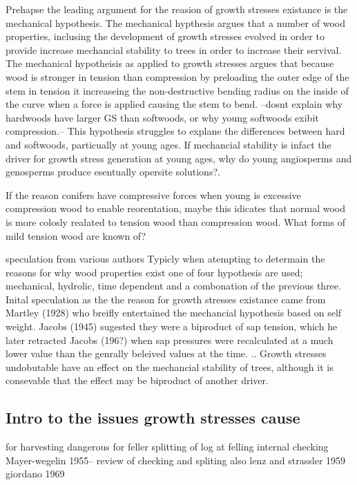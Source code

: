 \documentclass{article}
\begin{document}
Prehapse the leading argument for the reasion of growth stresses existance is
the mechanical hypothesis. The mechanical hypthesis argues that a number of wood properties,
inclusing the development of growth stresses evolved in order to provide
increase mechancial stability to trees in order to increase their servival. The
mechanical hypotheisis as applied to growth stresses argues that because wood is
stronger in tension than compression by preloading the outer edge of the stem
in tension it increaseing the non-destructive bending radius on the inside of
the curve when a force is applied causing the stem to bend. --dosnt explain why
hardwoods have larger GS than softwoods, or why young softwoods exibit
compression.-- This hypothesis struggles to explane the differences between hard
and softwoods, particually at young ages. If mechancial stability is infact the
driver for growth stress generation at young ages, why do young angiosperms and
genosperms produce esentually opersite solutions?.

If the reason conifers have compressive forces when young is excessive
compression wood to enable reorentation, maybe this idicates that normal wood is
more colosly realated to tension wood than compression wood. What forms of mild
tension wood are known of?

speculation from various authors
Typicly when atempting to determain the reasons for why wood properties exist
one of four hypothesis are used; mechanical, hydrolic, time dependent and a
combonation of the previous three. Inital speculation as the the reason for
growth stresses existance came from Martley (1928) who breifly entertained the
mechancial hypothesis based on self weight. Jacobs (1945) sugested they were a
biproduct of sap tension, which he later retracted Jacobs (196?) when sap
pressures were recalculated at a much lower value than the genrally beleived
values at the time. .. Growth stresses undobutable have an effect on the
mechancial stability of trees, although it is consevable that the effect may be
biproduct of another driver.


\subsection{Intro to the issues growth stresses cause }

for harvesting
dangerous for feller
splitting of log at felling
internal checking
Mayer-wegelin 1955-- review of checking and spliting also lenz and strassler
1959 giordano 1969
\end{document}
